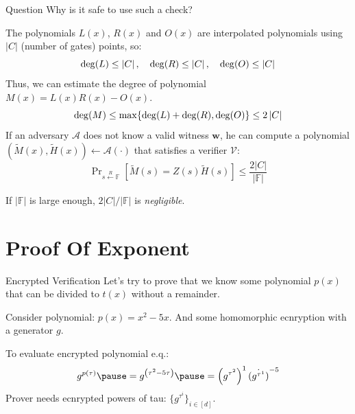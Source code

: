 \documentclass{zkdl-presentation-template}
\begin{document}
    \begin{frame}
        \begin{alertblock}{Question}
            Why is it safe to use such a check?
        \end{alertblock}

        The polynomials $L(x)$, $R(x)$ and $O(x)$ are interpolated polynomials using 
        $\left| C \right|$ (number of gates) points, so:
        \vspace{-5pt}
        \begin{equation*}
            \deg(L) \le \left| C \right|, \quad
            \deg(R) \le \left| C \right|, \quad 
            \deg(O) \le \left| C \right|
            \vspace{-5pt}
        \end{equation*}
        \pause
        Thus, we can estimate the degree of polynomial $M(x) = L(x)R(x) - O(x)$.
        \vspace{-5pt}
        \begin{equation*}
            \deg(M) \leq \max\{\deg(L) + \deg(R), \deg(O)\} \leq 2 \left| C \right|
            \vspace{-5pt}
        \end{equation*}
        \pause
        If an adversary $\mathcal{A}$ does not know a valid witness $\mathbf{w}$, he can compute a
        polynomial $(\widetilde{M}(x), \widetilde{H}(x)) \gets \mathcal{A}(\cdot)$ that satisfies a verifier 
        $\mathcal{V}$:
        \vspace{-5pt}
        \begin{equation*}
            \mathop{\text{Pr}}_{s \xleftarrow{R} \mathbb{F}}[\widetilde{M}(s) = Z(s)\widetilde{H}(s)] \leq \frac{2 \left| C \right|}{|\mathbb{F}|}
        \end{equation*}

        If $|\mathbb{F}|$ is large enough, $2|C|/|\mathbb{F}|$ is \textit{negligible}.
    \end{frame}

    \section{Proof Of Exponent}

    \begin{frame}{Encrypted Verification}
        Let's try to prove that we know some polynomial $p(x)$ that can be divided to $t(x)$ without a 
        remainder.

        \pause
        Consider polynomial: $p(x) = x^2 - 5x$. \pause And some homomorphic ecnryption with a
        generator $g$.
        
        To evaluate encrypted polynomial e.q.:
        {\large
        \begin{equation*}
            g^{p(\tau)} \pause = g^{\left( \tau^2 - 5\tau \right)} \pause = \left( g^{\tau^2} \right)^1 \dot {\left( g^{\tau^1} \right)}^{-5}
        \end{equation*}}
        Prover needs ecnrypted powers of tau: $\{g^{\tau^i}\}_{i \in [d]}$.
    \end{frame}
\end{document}
